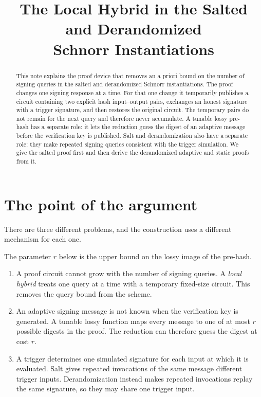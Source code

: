 \documentclass[11pt]{article}
\title{The Local Hybrid in the Salted and Derandomized\\Schnorr Instantiations}
\author{}
\date{}
\begin{document}
\maketitle

\begin{abstract}
This note explains the proof device that removes an a priori bound on the
number of signing queries in the salted and derandomized Schnorr
instantiations.  The proof changes one signing response at a time.  For that
one change it temporarily publishes a circuit containing two explicit hash
input--output pairs, exchanges an honest signature with a trigger signature,
and then restores the original circuit.  The temporary pairs do not remain
for the next query and therefore never accumulate.  A tunable lossy pre-hash
has a separate role: it lets the reduction guess the digest of an adaptive
message before the verification key is published.  Salt and derandomization
also have a separate role: they make repeated signing queries consistent with
the trigger simulation.  We give the salted proof first and then derive the
derandomized adaptive and static proofs from it.
\end{abstract}

\section{The point of the argument}

There are three different problems, and the construction uses a different
mechanism for each one.

The parameter \(r\) below is the upper bound on the lossy image of the
pre-hash.

\begin{enumerate}[leftmargin=2em]
\item A proof circuit cannot grow with the number of signing queries.  A
      \emph{local hybrid} treats one query at a time with a temporary
      fixed-size circuit.  This removes the query bound from the scheme.
\item An adaptive signing message is not known when the verification key is
      generated.  A tunable lossy function maps every message to one of at
      most \(r\) possible digests in the proof.  The reduction can therefore
      guess the digest at cost \(r\).
\item A trigger determines one simulated signature for each input at which
      it is evaluated.  Salt gives repeated invocations of the same message
      different trigger inputs.  Derandomization instead makes repeated
      invocations replay the same signature, so they may share one trigger
      input.
\end{enumerate}
\end{document}
